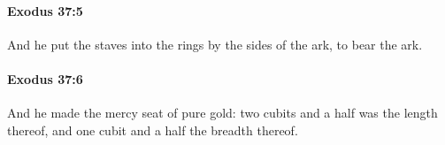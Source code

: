 		\paragraph{Exodus 37:5} %
			\label{EXODUS-37-5}

			And he put the staves into the rings by the sides of the ark, to bear the ark.


		\paragraph{Exodus 37:6} %
			\label{EXODUS-37-6}

			And he made the mercy seat of pure gold: two cubits and a half was the length thereof, and one cubit and a half the breadth thereof.


